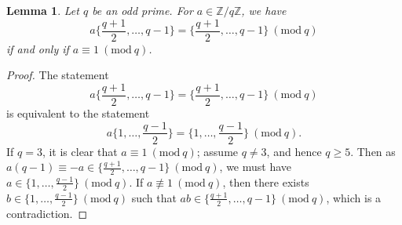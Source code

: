 \documentclass[letterpaper,10pt]{amsart}
\newcommand{\ZZ}{\mathbb{Z}}      %
\newcommand{\Mod}[1]{\ (\mathrm{mod}\ #1)}
\newtheorem{lemma}[theorem]{Lemma}
\theoremstyle{definition}
\theoremstyle{remark}
\begin{document}
\begin{lemma}
\label{lem:helper-helper}
Let $q$ be an odd prime. For $a \in \ZZ/q\ZZ$, we have
\[
a\bigg\{\frac{q+1}{2},\dots,q-1\bigg\} = \bigg\{\frac{q+1}{2},\dots,q-1\bigg\} \Mod{q}
\]
if and only if $a \equiv 1 \Mod{q}$.
\end{lemma}
\begin{proof}
The statement 
\[
a\bigg\{\frac{q+1}{2},\dots,q-1\bigg\} = \bigg\{\frac{q+1}{2},\dots,q-1\bigg\} \Mod{q}
\]
is equivalent to the statement 
\[
a\bigg\{1,\dots,\frac{q-1}{2}\bigg \} = \bigg\{1,\dots,\frac{q-1}{2}\bigg \} \Mod{q}.
\]
If $q = 3$, it is clear that $a \equiv 1 \Mod{q}$; assume $q \neq 3$, and hence $q \geq 5$. Then as $a(q-1) \equiv -a \in \{\frac{q+1}{2},\dots,q-1\} \Mod{q}$, we must have $a \in \{1,\dots,\frac{q-1}{2}\} \Mod{q}$. If $a \not\equiv 1 \Mod{q}$, then there exists $b \in \{1,\dots,\frac{q-1}{2}\} \Mod{q}$ such that $ab \in \{\frac{q+1}{2},\dots,q-1\} \Mod{q}$, which is a contradiction.
\end{proof}
\end{document}
